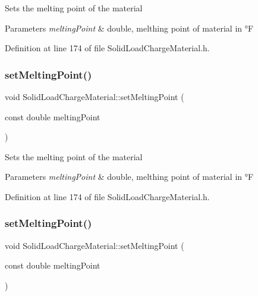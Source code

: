 Sets the melting point of the material 
\begin{DoxyParams}{Parameters}
{\em melting\+Point} & double, melthing point of material in °F \\
\hline
\end{DoxyParams}


Definition at line 174 of file Solid\+Load\+Charge\+Material.\+h.

\mbox{\label{class_solid_load_charge_material_a6c235b1c49be98b02829d37af9c38cb2}} 
\subsubsection{\texorpdfstring{set\+Melting\+Point()}{setMeltingPoint()}\hspace{0.1cm}{\footnotesize\ttfamily [2/3]}}
{\footnotesize\ttfamily void Solid\+Load\+Charge\+Material\+::set\+Melting\+Point (\begin{DoxyParamCaption}\item[{const double}]{melting\+Point }\end{DoxyParamCaption})\hspace{0.3cm}{\ttfamily [inline]}}

Sets the melting point of the material 
\begin{DoxyParams}{Parameters}
{\em melting\+Point} & double, melthing point of material in °F \\
\hline
\end{DoxyParams}


Definition at line 174 of file Solid\+Load\+Charge\+Material.\+h.

\mbox{\label{class_solid_load_charge_material_a6c235b1c49be98b02829d37af9c38cb2}} 
\subsubsection{\texorpdfstring{set\+Melting\+Point()}{setMeltingPoint()}\hspace{0.1cm}{\footnotesize\ttfamily [3/3]}}
{\footnotesize\ttfamily void Solid\+Load\+Charge\+Material\+::set\+Melting\+Point (\begin{DoxyParamCaption}\item[{const double}]{melting\+Point }\end{DoxyParamCaption})\hspace{0.3cm}{\ttfamily [inline]}}

